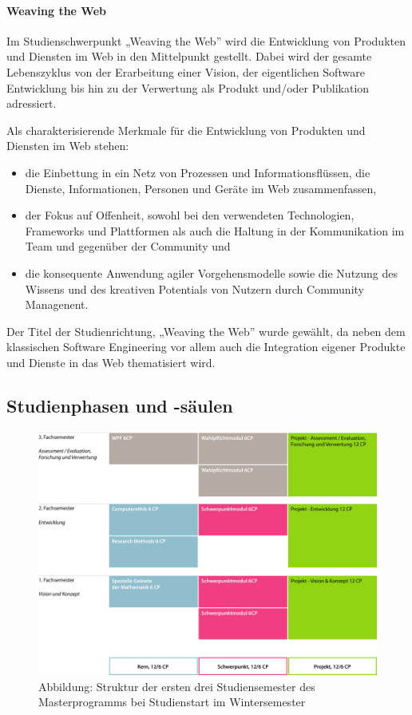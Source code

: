 \paragraph{Weaving the Web}\label{weaving-the-web}

Im Studienschwerpunkt „Weaving the Web'' wird die Entwicklung von
Produkten und Diensten im Web in den Mittelpunkt gestellt. Dabei wird
der gesamte Lebenszyklus von der Erarbeitung einer Vision, der
eigentlichen Software Entwicklung bis hin zu der Verwertung als Produkt
und/oder Publikation adressiert.

Als charakterisierende Merkmale für die Entwicklung von Produkten und
Diensten im Web stehen:

\begin{itemize}
\item
  die Einbettung in ein Netz von Prozessen und Informationsflüssen, die
  Dienste, Informationen, Personen und Geräte im Web zusammenfassen,
\item
  der Fokus auf Offenheit, sowohl bei den verwendeten Technologien,
  Frameworks und Plattformen als auch die Haltung in der Kommunikation
  im Team und gegenüber der Community und
\item
  die konsequente Anwendung agiler Vorgehensmodelle sowie die Nutzung
  des Wissens und des kreativen Potentials von Nutzern durch Community
  Managenent.
\end{itemize}

Der Titel der Studienrichtung, „Weaving the Web'' wurde gewählt, da
neben dem klassischen Software Engineering vor allem auch die
Integration eigener Produkte und Dienste in das Web thematisiert wird.

\subsection{Studienphasen und
-säulen}\label{studienphasen-und--suxe4ulen-1}

\begin{figure}[htbp][htbp]
\centering
\includegraphics[width=\columnwidth]{../anhaenge/bilder/ma-struktur.png}
\caption{Abbildung: Struktur der ersten drei Studiensemester des
Masterprogramms bei Studienstart im Wintersemester}
\end{figure}

